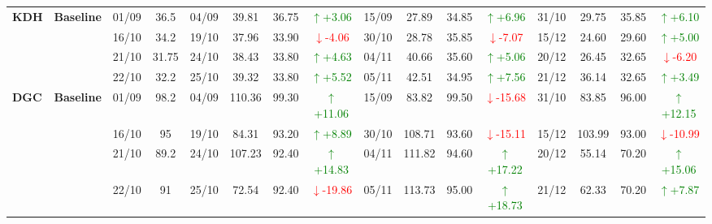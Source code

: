 \documentclass{ieeeaccess}
\begin{document}
{\begin{longtable}{llcc|cccc|cccc|cccc}
\multirow{4}{*}{\textbf{KDH}}
& \textbf{Baseline}
& 01/09 & 36.5 & 04/09 & 39.81 & 36.75 & \textcolor{green}{\(\uparrow\)+3.06} & 15/09 & 27.89 & 34.85 & \textcolor{green}{\(\uparrow\)+6.96} & 31/10 & 29.75 & 35.85 & \textcolor{green}{\(\uparrow\)+6.10} \\
& & 16/10 & 34.2 & 19/10 & 37.96 & 33.90 & \textcolor{red}{\(\downarrow\)-4.06} & 30/10 & 28.78 & 35.85 & \textcolor{red}{\(\downarrow\)-7.07} & 15/12 & 24.60 & 29.60 & \textcolor{green}{\(\uparrow\)+5.00} \\
& & 21/10 & 31.75 & 24/10 & 38.43 & 33.80 & \textcolor{green}{\(\uparrow\)+4.63} & 04/11 & 40.66 & 35.60 & \textcolor{green}{\(\uparrow\)+5.06} & 20/12 & 26.45 & 32.65 & \textcolor{red}{\(\downarrow\)-6.20} \\
& & 22/10 & 32.2 & 25/10 & 39.32 & 33.80 & \textcolor{green}{\(\uparrow\)+5.52} & 05/11 & 42.51 & 34.95 & \textcolor{green}{\(\uparrow\)+7.56} & 21/12 & 36.14 & 32.65 & \textcolor{green}{\(\uparrow\)+3.49} \\
\midrule

\multirow{4}{*}{\textbf{DGC}}
& \textbf{Baseline}
& 01/09 & 98.2 & 04/09 & 110.36 & 99.30 & \textcolor{green}{\(\uparrow\)+11.06} & 15/09 & 83.82 & 99.50 & \textcolor{red}{\(\downarrow\)-15.68} & 31/10 & 83.85 & 96.00 & \textcolor{green}{\(\uparrow\)+12.15} \\
& & 16/10 & 95 & 19/10 & 84.31 & 93.20 & \textcolor{green}{\(\uparrow\)+8.89} & 30/10 & 108.71 & 93.60 & \textcolor{red}{\(\downarrow\)-15.11} & 15/12 & 103.99 & 93.00 & \textcolor{red}{\(\downarrow\)-10.99} \\
& & 21/10 & 89.2 & 24/10 & 107.23 & 92.40 & \textcolor{green}{\(\uparrow\)+14.83} & 04/11 & 111.82 & 94.60 & \textcolor{green}{\(\uparrow\)+17.22} & 20/12 & 55.14 & 70.20 & \textcolor{green}{\(\uparrow\)+15.06} \\
& & 22/10 & 91 & 25/10 & 72.54 & 92.40 & \textcolor{red}{\(\downarrow\)-19.86} & 05/11 & 113.73 & 95.00 & \textcolor{green}{\(\uparrow\)+18.73} & 21/12 & 62.33 & 70.20 & \textcolor{green}{\(\uparrow\)+7.87} \\
\midrule


\end{longtable}}
\end{document}
